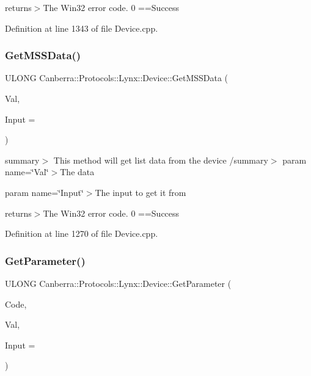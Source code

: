 returns$>$The Win32 error code. 0 ==Success

Definition at line 1343 of file Device.\+cpp.

\mbox{\label{class_canberra_1_1_protocols_1_1_lynx_1_1_device_a49215c7186fc99e486ec514488dad437_a49215c7186fc99e486ec514488dad437}} 
\subsubsection{\texorpdfstring{Get\+M\+S\+S\+Data()}{GetMSSData()}}
{\footnotesize\ttfamily U\+L\+O\+NG Canberra\+::\+Protocols\+::\+Lynx\+::\+Device\+::\+Get\+M\+S\+S\+Data (\begin{DoxyParamCaption}\item[{\hyperlink{class_canberra_1_1_protocols_1_1_lynx_1_1_spectral_data_list}{Spectral\+Data\+List} \&}]{Val,  }\item[{U\+S\+H\+O\+RT}]{Input = {} }\end{DoxyParamCaption})}

summary$>$ This method will get list data from the device /summary$>$ param name=\char`\"{}\+Val\char`\"{}$>$The data

param name=\char`\"{}\+Input\char`\"{}$>$The input to get it from

returns$>$The Win32 error code. 0 ==Success

Definition at line 1270 of file Device.\+cpp.

\mbox{\label{class_canberra_1_1_protocols_1_1_lynx_1_1_device_a93c602c8408cc3355fc91b43f45247e2_a93c602c8408cc3355fc91b43f45247e2}} 
\subsubsection{\texorpdfstring{Get\+Parameter()}{GetParameter()}}
{\footnotesize\ttfamily U\+L\+O\+NG Canberra\+::\+Protocols\+::\+Lynx\+::\+Device\+::\+Get\+Parameter (\begin{DoxyParamCaption}\item[{L\+O\+NG}]{Code,  }\item[{\hyperlink{class_canberra_1_1_utility_1_1_core_1_1_variant}{Canberra\+::\+Utility\+::\+Core\+::\+Variant} \&}]{Val,  }\item[{U\+S\+H\+O\+RT}]{Input = {} }\end{DoxyParamCaption})}

